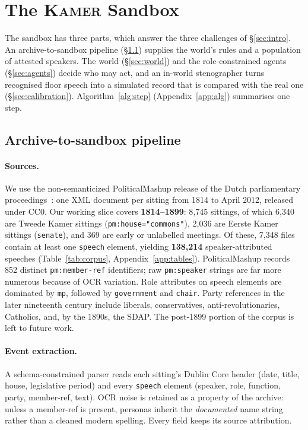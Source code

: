 \documentclass[sigconf,review,anonymous]{acmart}
\newcommand{\sys}{\textsc{Kamer}}
\begin{document}
\section{The \sys{} Sandbox}
\label{sec:sandbox}

The sandbox has three parts, which answer the three challenges of
\S\ref{sec:intro}. An archive-to-sandbox pipeline (\S\ref{sec:pipeline})
supplies the world's rules and a population of attested speakers. The
world (\S\ref{sec:world}) and the role-constrained agents
(\S\ref{sec:agents}) decide who may act, and an in-world stenographer
turns recognised floor speech into a simulated record that is compared
with the real one (\S\ref{sec:calibration}). Algorithm~\ref{alg:step}
(Appendix~\ref{app:alg}) summarises one step.

\subsection{Archive-to-sandbox pipeline}
\label{sec:pipeline}

\paragraph{Sources.} We use the non-semanticized PoliticalMashup release of
the Dutch parliamentary proceedings~\cite{marx2012dutchparl}: one XML
document per sitting from 1814 to April 2012, released under CC0. Our
working slice covers \textbf{1814--1899}: 8{,}745 sittings, of which
6{,}340 are Tweede Kamer sittings (\texttt{pm:house="commons"}), 2{,}036
are Eerste Kamer sittings (\texttt{senate}), and 369 are early or
unlabelled meetings. Of these, 7{,}348 files contain at least one
\texttt{speech} element, yielding \textbf{138{,}214} speaker-attributed
speeches (Table~\ref{tab:corpus}, Appendix~\ref{app:tables}).
PoliticalMashup records 852 distinct \texttt{pm:member-ref}
identifiers; raw \texttt{pm:speaker} strings are far more numerous because
of OCR variation. Role attributes on speech elements are dominated by
\texttt{mp}, followed by \texttt{government} and \texttt{chair}. Party
references in the later nineteenth century include liberals,
conservatives, anti-revolutionaries, Catholics, and, by the 1890s, the
SDAP. The post-1899 portion of the corpus is left to future work.


\paragraph{Event extraction.} A schema-constrained parser reads each
sitting's Dublin Core header (date, title, house, legislative period) and
every \texttt{speech} element (speaker, role, function, party, member-ref,
text). OCR noise is retained as a property of the archive: unless a
member-ref is present, personas inherit the \emph{documented} name string
rather than a cleaned modern spelling. Every field keeps its source
attribution.
\end{document}

